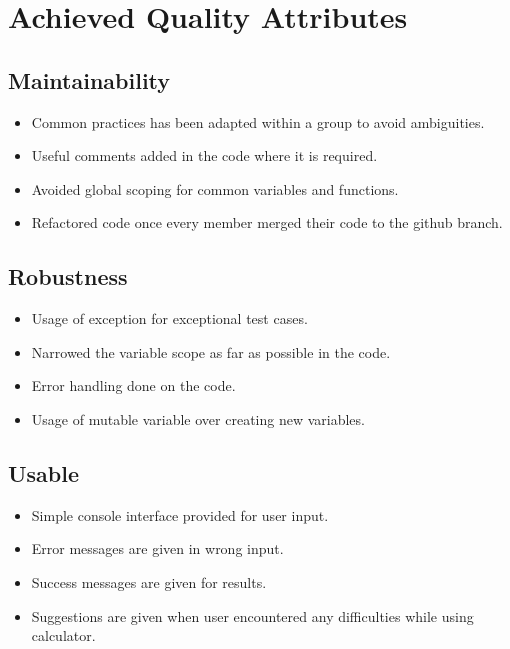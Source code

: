 \documentclass[a4paper,12pt]{article}
\begin{document}
\section{Achieved Quality Attributes}

    \subsection{Maintainability}
        \begin{itemize}
            \item Common practices has been adapted within a group to avoid ambiguities.
            \item Useful comments added in the code where it is required.
            \item Avoided global scoping for common variables and functions.
            \item Refactored code once every member merged their code to the github branch.
        \end{itemize}
    
   
    \subsection{Robustness}
        \begin{itemize}
            \item Usage of exception for exceptional test cases.
            \item Narrowed the variable scope as far as possible in the code.
            \item Error handling done on the code.
            \item Usage of mutable variable over creating new variables.
        \end{itemize}
  
    
    \subsection{Usable}
        \begin{itemize}
            \item Simple console interface provided for user input.
            \item Error messages are given in wrong input.
            \item Success messages are given for results.
            \item Suggestions are given when user encountered any difficulties while using calculator.
        \end{itemize}
        
\end{document}
